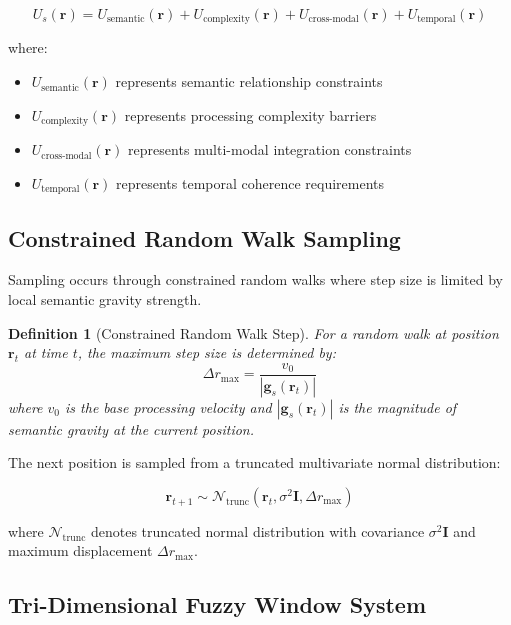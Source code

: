 \documentclass[12pt,a4paper]{article}
\newtheorem{definition}{Definition}
\begin{document}
\begin{equation}
U_s(\mathbf{r}) = U_{\text{semantic}}(\mathbf{r}) + U_{\text{complexity}}(\mathbf{r}) + U_{\text{cross-modal}}(\mathbf{r}) + U_{\text{temporal}}(\mathbf{r})
\end{equation}

where:
\begin{itemize}
\item $U_{\text{semantic}}(\mathbf{r})$ represents semantic relationship constraints
\item $U_{\text{complexity}}(\mathbf{r})$ represents processing complexity barriers
\item $U_{\text{cross-modal}}(\mathbf{r})$ represents multi-modal integration constraints
\item $U_{\text{temporal}}(\mathbf{r})$ represents temporal coherence requirements
\end{itemize}

\subsection{Constrained Random Walk Sampling}

Sampling occurs through constrained random walks where step size is limited by local semantic gravity strength.

\begin{definition}[Constrained Random Walk Step]
For a random walk at position $\mathbf{r}_t$ at time $t$, the maximum step size is determined by:
\begin{equation}
\Delta r_{\max} = \frac{v_0}{|\mathbf{g}_s(\mathbf{r}_t)|}
\end{equation}
where $v_0$ is the base processing velocity and $|\mathbf{g}_s(\mathbf{r}_t)|$ is the magnitude of semantic gravity at the current position.
\end{definition}

The next position is sampled from a truncated multivariate normal distribution:

\begin{equation}
\mathbf{r}_{t+1} \sim \mathcal{N}_{\text{trunc}}(\mathbf{r}_t, \sigma^2 \mathbf{I}, \Delta r_{\max})
\end{equation}

where $\mathcal{N}_{\text{trunc}}$ denotes truncated normal distribution with covariance $\sigma^2 \mathbf{I}$ and maximum displacement $\Delta r_{\max}$.

\subsection{Tri-Dimensional Fuzzy Window System}
\end{document}
